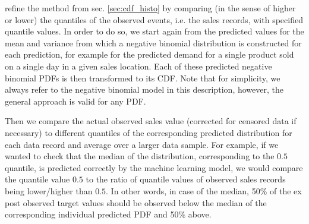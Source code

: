\documentclass[BCOR=1mm, DIV=calc,10pt,
twoside=true,
twocolumn,
headings=normal]{scrartcl}
\begin{document}
 refine the method from sec. \ref{sec:cdf_histo} by comparing (in the sense of higher or lower) the quantiles of the observed events, i.e. the sales records, with specified quantile values. In order to do so, we start again from the predicted values for the mean and variance from which a negative binomial distribution is constructed for each prediction, for example for the predicted demand for a single product sold on a single day in a given sales location. Each of these predicted negative binomial PDFs is then transformed to its CDF. Note that for simplicity, we always refer to the negative binomial model in this description, however, the general approach is valid for any PDF.

Then we compare the actual observed sales value (corrected for censored data if necessary) to different quantiles of the corresponding predicted distribution for each data record and average over a larger data sample. For example, if we wanted to check that the median of the distribution, corresponding to the $0.5$ quantile, is predicted correctly by the machine learning model, we would compare the quantile value $0.5$ to the ratio of quantile values of observed sales records being lower/higher than $0.5$. In other words, in case of the median, 50\% of the ex post observed target values should be observed below the median of the corresponding individual predicted PDF and 50\% above.
\end{document}
